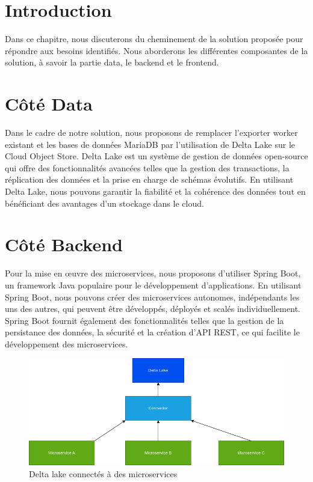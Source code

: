 \section*{Introduction}

Dans ce chapitre, nous discuterons du cheminement de la solution proposée pour répondre aux besoins identifiés. Nous aborderons les différentes composantes de la solution, à savoir la partie data, le backend et le frontend.

\section{Côté Data}
Dans le cadre de notre solution, nous proposons de remplacer l'exporter worker existant et les bases de données MariaDB par l'utilisation de Delta Lake sur le Cloud Object Store. Delta Lake est un système de gestion de données open-source qui offre des fonctionnalités avancées telles que la gestion des transactions, la réplication des données et la prise en charge de schémas évolutifs. En utilisant Delta Lake, nous pouvons garantir la fiabilité et la cohérence des données tout en bénéficiant des avantages d'un stockage dans le cloud.

\section{Côté Backend}
Pour la mise en œuvre des microservices, nous proposons d'utiliser Spring Boot, un framework Java populaire pour le développement d'applications. En utilisant Spring Boot, nous pouvons créer des microservices autonomes, indépendants les uns des autres, qui peuvent être développés, déployés et scalés individuellement. Spring Boot fournit également des fonctionnalités telles que la gestion de la persistance des données, la sécurité et la création d'API REST, ce qui facilite le développement des microservices.

\begin{figure}[H]
\centering
\includegraphics[width=\linewidth]{images/delta-lake-microservices.png}
\caption{Delta lake connectés à des microservices}\label{fig:schema-delta}
\end{figure}

